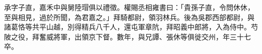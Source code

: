 \begin{pinyinscope}
 
 
 承字子直，嘉禾中與舅陸瑁俱以禮徵。權賜丞相雍書曰：「貴孫子直，令問休休，至與相見，過於所聞，為君嘉之。」拜騎都尉，領羽林兵。後為吳郡西部都尉，與諸葛恪等共平山越，別得精兵八千人，還屯軍章阬，拜昭義中郎將，入為侍中。芍陂之役，拜奮威將軍，出領京下督。數年，與兄譚、張休等俱徙交州，年三十七卒。
 
 
\end{pinyinscope}